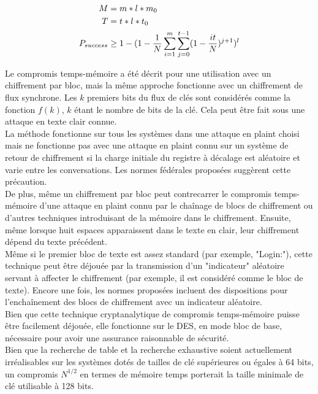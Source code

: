 	\begin{align*}
		M &= m*l*m_0\\
		T &= t*l*t_0\\
		P_{success} &\ge{} 1 - (1 - \frac{1}{N} \sum\limits_{i=1}^{m}\sum\limits_{j=0}^{t-1} (1 - \frac{it}{N})^{j+1})^l
	\end{align*}

	Le compromis temps-mémoire a été décrit pour une utilisation avec un chiffrement par bloc\cite{ehellman}, mais la même approche fonctionne avec un chiffrement de flux synchrone\cite{ehellman}. Les $k$ premiers bits du flux de clés sont considérés comme la fonction $f(k)$, $k$ étant le nombre de bits de la clé. Cela peut être fait sous une attaque en texte clair connue.\\

	La méthode fonctionne sur tous les systèmes dans une attaque en \gls{plaint} choisi mais ne fonctionne pas avec une attaque en \gls{plaint} connu sur un système de retour de chiffrement si la charge initiale du registre à décalage est aléatoire et varie entre les conversations. Les normes fédérales proposées\cite{ehellman} suggèrent cette précaution.\\

	De plus, même un chiffrement par bloc peut contrecarrer le compromis temps-mémoire d'une attaque en \gls{plaint} connu par le chaînage de blocs de chiffrement ou d'autres techniques introduisant de la mémoire dans le chiffrement. Ensuite, même lorsque huit espaces apparaissent dans le texte en clair, leur chiffrement dépend du texte précédent.\\

	Même si le premier bloc de texte est assez standard (par exemple, "Login:"), cette technique peut être déjouée par la transmission d'un "indicateur" aléatoire servant à affecter le chiffrement (par exemple, il est considéré comme le bloc de texte). Encore une fois, les normes proposées\cite{ehellman} incluent des dispositions pour l'enchaînement des blocs de chiffrement avec un indicateur aléatoire.\\

	Bien que cette technique cryptanalytique de compromis temps-mémoire puisse être facilement déjouée, elle fonctionne sur le DES, en mode bloc de base, nécessaire pour avoir une assurance raisonnable de sécurité.\\

	Bien que la recherche de table et la recherche exhaustive soient actuellement irréalisables sur les systèmes dotés de tailles de clé supérieures ou égales à 64 bits, un compromis $N^{1/2}$ en termes de mémoire temps porterait la taille minimale de clé utilisable à 128 bits.\\

